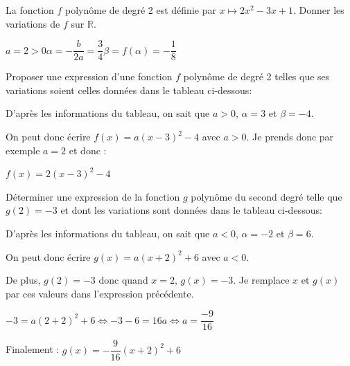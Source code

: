 \documentclass[11pt,a4paper]{article}  %
\begin{document}

La fonction $f$ polynôme de degré 2 est définie par $x \mapsto 2 x^2-3 x+1$. Donner les variations de $f$ sur $\mathbb{R}$.

\begin{corrBox}
	$a=2>0$\quad \quad \quad $\alpha=-\dfrac{b}{2a}=\dfrac{3}{4}$\quad \quad \quad $\beta=f(\alpha)=-\dfrac{1}{8}$
	
\end{corrBox}


Proposer une expression d'une fonction $f$ polynôme de degré 2 telles que ses variations soient celles données dans le tableau ci-dessous:


\begin{corrBox}
	D'après les informations du tableau, on sait que $a>0$, $\alpha=3$ et $\beta=-4$.
	
	On peut donc écrire $f(x)=a(x-3)^2-4$ avec $a>0$. Je prends donc par exemple $a=2$ et donc :
	
	$f(x)=2(x-3)^2-4$	
\end{corrBox}


Déterminer une expression de la fonction $g$ polynôme du second degré telle que $g(2)=-3$ et dont les variations sont données dans le tableau ci-dessous:


\begin{corrBox}
	D'après les informations du tableau, on sait que $a<0$, $\alpha=-2$ et $\beta=6$.
	
	On peut donc écrire $g(x)=a(x+2)^2+6$ avec $a<0$. 
	
	De plus, $g(2)=-3$ donc quand $x=2$, $g(x)=-3$. Je remplace $x$ et $g(x)$ par ces valeurs dans l'expression précédente.
	
	$-3=a(2+2)^2+6 \iff -3-6=16a\iff a=\dfrac{-9}{16}$
	
	Finalement : $g(x)=-\dfrac{9}{16}(x+2)^2+6$	
\end{corrBox}
\end{document}
